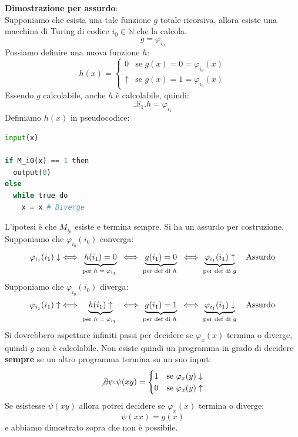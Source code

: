 \documentclass[a4paper]{article}
\begin{document}
\vspace{1em}
\noindent
\textbf{Dimostrazione per assurdo}:\\
Supponiamo che esista una tale funzione \( g \) totale ricorsiva, allora esiste
una macchina di Turing di codice \( i_0 \in \mathbb{N} \) che la calcola.
\[
  g = \varphi_{i_0}
\] 
Possiamo definire una nuova funzione \( h \):
\[
  h(x) = 
  \begin{cases}
    0 & \text{se } g(x) = 0 = \varphi_{i_0}(x) \\
    \uparrow & \text{se } g(x) = 1 = \varphi_{i_0}(x)
  \end{cases}
\] 
Essendo \( g \) calcolabile, anche \( h \) è calcolabile, quindi:
\[
  \exists i_1 . h = \varphi_{i_1}
\] 
Definiamo \( h(x) \) in pseudocodice:
\begin{lstlisting}[language=Python]
input(x)

if M_i0(x) == 1 then
  output(0)
else 
  while true do 
    x = x # Diverge
\end{lstlisting}
L'ipotesi è che \( M_{i_0} \) esiste e termina sempre. Si ha un assurdo per costruzione.
Supponiamo che \( \varphi_{i_0}(i_0) \) converga:
\[
  \varphi_{i_1}(i_1) \downarrow
  \iff \underbrace{h(i_1) = 0}_{\text{per \( h = \varphi_{i_1} \) }}
  \iff \underbrace{g(i_1) = 0}_{\text{per def di \( h \) }}
  \iff \underbrace{\varphi_{i_1}(i_1) \uparrow}_{\text{per def di \( g \)}} \quad \text{Assurdo}
\] 
Supponiamo che \( \varphi_{i_0}(i_0) \) diverga:
\[
  \varphi_{i_1}(i_1) \uparrow
  \iff \underbrace{h(i_1) \uparrow}_{\text{per \( h = \varphi_{i_1} \) }}
  \iff \underbrace{g(i_1) = 1}_{\text{per def di \( h \) }}
  \iff \underbrace{\varphi_{i_1}(i_1) \downarrow}_{\text{per def di \( g \)}} \quad \text{Assurdo}
\] 
Si dovrebbero aspettare infiniti passi per decidere se \( \varphi_x(x) \) termina o diverge,
quindi \( g \) non è calcolabile. Non esiste quindi un programma in grado di decidere
\textbf{sempre} se un altro programma termina su un suo input:
\[
  \not \exists \psi . \psi(xy) =
  \begin{cases}
    1 & \text{se } \varphi_x(y) \downarrow \\
    0 & \text{se } \varphi_x(y) \uparrow
  \end{cases}
\] 
Se esistesse \( \psi(xy) \) allora potrei decidere se \( \varphi_x(x) \) termina o diverge:
\[
  \psi(xx) = g(x)
\] 
e abbiamo dimostrato sopra che non è possibile.
\end{document}
